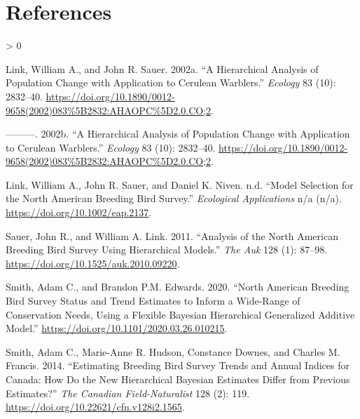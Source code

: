 \documentclass[
]{book}
\newlength{\cslhangindent}
\newenvironment{CSLReferences}[2] %
 {%
  \setlength{\parindent}{0pt}
  \ifodd #1 \everypar{\setlength{\hangindent}{\cslhangindent}}\ignorespaces\fi
  \ifnum #2 > 0
  \setlength{\parskip}{#2\baselineskip}
  \fi
 }%
 {}
\begin{document}
\hypertarget{Ref}{%
\chapter{References}\label{Ref}}

\hypertarget{refs}{}
\begin{CSLReferences}{1}{0}
\leavevmode\hypertarget{ref-link2002}{}%
Link, William A., and John R. Sauer. 2002a. {``A Hierarchical Analysis of Population Change with Application to Cerulean Warblers.''} \emph{Ecology} 83 (10): 2832--40. \url{https://doi.org/10.1890/0012-9658(2002)083\%5B2832:AHAOPC\%5D2.0.CO;2}.

\leavevmode\hypertarget{ref-link2002a}{}%
---------. 2002b. {``A Hierarchical Analysis of Population Change with Application to Cerulean Warblers.''} \emph{Ecology} 83 (10): 2832--40. \url{https://doi.org/10.1890/0012-9658(2002)083\%5B2832:AHAOPC\%5D2.0.CO;2}.

\leavevmode\hypertarget{ref-link}{}%
Link, William A., John R. Sauer, and Daniel K. Niven. n.d. {``Model Selection for the North American Breeding Bird Survey.''} \emph{Ecological Applications} n/a (n/a). \url{https://doi.org/10.1002/eap.2137}.

\leavevmode\hypertarget{ref-sauer2011}{}%
Sauer, John R., and William A. Link. 2011. {``Analysis of the North American Breeding Bird Survey Using Hierarchical Models.''} \emph{The Auk} 128 (1): 87--98. \url{https://doi.org/10.1525/auk.2010.09220}.

\leavevmode\hypertarget{ref-smith2020a}{}%
Smith, Adam C., and Brandon P.M. Edwards. 2020. {``North American Breeding Bird Survey Status and Trend Estimates to Inform a Wide-Range of Conservation Needs, Using a Flexible Bayesian Hierarchical Generalized Additive Model.''} \url{https://doi.org/10.1101/2020.03.26.010215}.

\leavevmode\hypertarget{ref-smith2014}{}%
Smith, Adam C., Marie-Anne R. Hudson, Constance Downes, and Charles M. Francis. 2014. {``Estimating Breeding Bird Survey Trends and Annual Indices for Canada: How Do the New Hierarchical Bayesian Estimates Differ from Previous Estimates?''} \emph{The Canadian Field-Naturalist} 128 (2): 119. \url{https://doi.org/10.22621/cfn.v128i2.1565}.

\end{CSLReferences}
\end{document}
